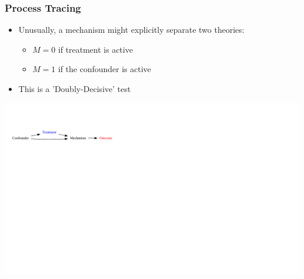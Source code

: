 \documentclass[xcolor=x11names,compress]{beamer}\usepackage[]{graphicx}\usepackage[]{color}
\newenvironment{knitrout}{}{} %
\renewcommand{\(}{\begin{columns}}
\renewcommand{\)}{\end{columns}}
\newcommand{\<}[1]{\begin{column}{#1}}
\renewcommand{\>}{\end{column}}
\begin{document}
\begin{frame}
\frametitle{Process Tracing}
\begin{itemize}
\item Unusually, a mechanism might explicitly separate two theories:
\pause
\begin{itemize}
\item $M=0$ if treatment is active
\pause
\item $M=1$ if the confounder is active
\pause
\end{itemize}
\item This is a 'Doubly-Decisive' test
\end{itemize}
\begin{knitrout}
\color{fgcolor}
\includegraphics[width=1.8\linewidth]{figure/Dag5-1} 

\end{knitrout}
\end{frame}
\end{document}
